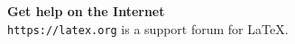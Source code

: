 \documentclass{article}
\begin{document}
\noindent\textsf{\textbf{Get help on the Internet}}\\
\texttt{https://latex.org} is a support forum for \LaTeX.
\end{document}
